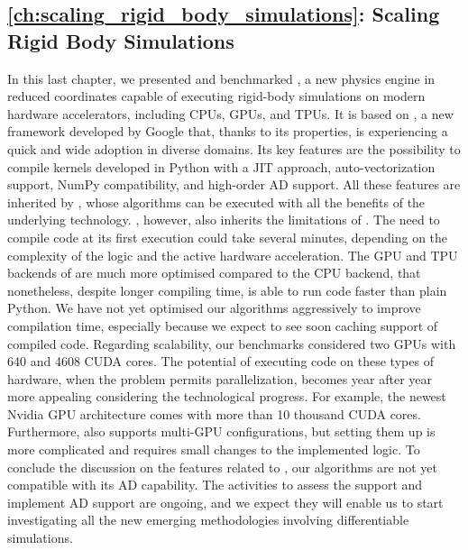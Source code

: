 \subsection*{\autoref{ch:scaling_rigid_body_simulations}: Scaling Rigid Body Simulations}

In this last chapter, we presented and benchmarked \jaxsim, a new physics engine in reduced coordinates capable of executing rigid-body simulations on modern hardware accelerators, including \acp{CPU}, \acp{GPU}, and \acp{TPU}.
It is based on \jax, a new framework developed by Google that, thanks to its properties, is experiencing a quick and wide adoption in diverse domains.
Its key features are the possibility to compile kernels developed in Python with a \ac{JIT} approach, auto-vectorization support, NumPy compatibility, and high-order \ac{AD} support.
All these features are inherited by \jaxsim, whose algorithms can be executed with all the benefits of the underlying technology.
\jaxsim, however, also inherits the limitations of \jax.
The need to compile code at its first execution could take several minutes, depending on the complexity of the logic and the active hardware acceleration.
The \ac{GPU} and \ac{TPU} backends of \jax are much more optimised compared to the \ac{CPU} backend, that nonetheless, despite longer compiling time, is able to run code faster than  plain Python.
We have not yet optimised our algorithms aggressively to improve compilation time, especially because we expect to see soon caching support of compiled code.
Regarding scalability, our benchmarks considered two \acp{GPU} with 640 and 4608 CUDA cores.
The potential of executing code on these types of hardware, when the problem permits parallelization, becomes year after year more appealing considering the technological progress.
For example, the newest Nvidia \ac{GPU} architecture comes with more than 10 thousand CUDA cores.
Furthermore, \jax also supports multi-\ac{GPU} configurations, but setting them up is more complicated and requires small changes to the implemented logic.
To conclude the discussion on the features related to \jax, our algorithms are not yet compatible with its \ac{AD} capability.
The activities to assess the support and implement \ac{AD} support are ongoing, and we expect they will enable us to start investigating all the new emerging methodologies involving differentiable simulations.


